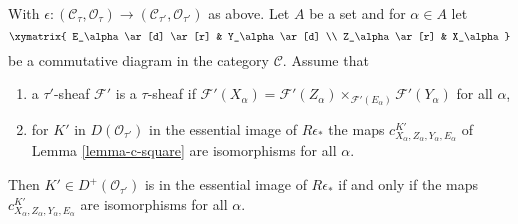 \begin{lemma}
\label{lemma-descent-squares}
With $\epsilon : (\mathcal{C}_\tau, \mathcal{O}_\tau) \to
(\mathcal{C}_{\tau'}, \mathcal{O}_{\tau'})$ as above.
Let $A$ be a set and for $\alpha \in A$ let
$$
\xymatrix{
E_\alpha \ar[d] \ar[r] & Y_\alpha \ar[d] \\
Z_\alpha \ar[r] & X_\alpha
}
$$
be a commutative diagram in the category $\mathcal{C}$. Assume that
\begin{enumerate}
\item a $\tau'$-sheaf $\mathcal{F}'$ is a $\tau$-sheaf if
$\mathcal{F}'(X_\alpha) =
\mathcal{F}'(Z_\alpha) \times_{\mathcal{F}'(E_\alpha)} 
\mathcal{F}'(Y_\alpha)$ for all $\alpha$,
\item for $K'$ in $D(\mathcal{O}_{\tau'})$ in the essential image
of $R\epsilon_*$ the maps $c^{K'}_{X_\alpha, Z_\alpha, Y_\alpha, E_\alpha}$
of Lemma \ref{lemma-c-square}
are isomorphisms for all $\alpha$.
\end{enumerate}
Then $K' \in D^+(\mathcal{O}_{\tau'})$ is in
the essential image of $R\epsilon_*$ if and only if
the maps $c^{K'}_{X_\alpha, Z_\alpha, Y_\alpha, E_\alpha}$
are isomorphisms for all $\alpha$.
\end{lemma}


